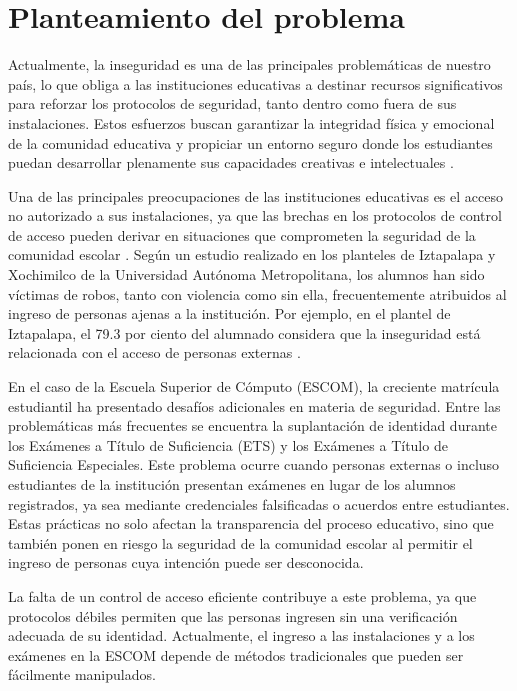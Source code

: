 

\section{Planteamiento del problema}

Actualmente, la inseguridad es una de las principales problemáticas de nuestro país, lo que obliga a las instituciones educativas a destinar recursos significativos para reforzar los protocolos de seguridad, tanto dentro como fuera de sus instalaciones. Estos esfuerzos buscan garantizar la integridad física y emocional de la comunidad educativa y propiciar un entorno seguro donde los estudiantes puedan desarrollar plenamente sus capacidades creativas e intelectuales \cite{L03}.

Una de las principales preocupaciones de las instituciones educativas es el acceso no autorizado a sus instalaciones, ya que las brechas en los protocolos de control de acceso pueden derivar en situaciones que comprometen la seguridad de la comunidad escolar \cite{L04}. Según un estudio realizado en los planteles de Iztapalapa y Xochimilco de la Universidad Autónoma Metropolitana, los alumnos han sido víctimas de robos, tanto con violencia como sin ella, frecuentemente atribuidos al ingreso de personas ajenas a la institución. Por ejemplo, en el plantel de Iztapalapa, el 79.3 por ciento del alumnado considera que la inseguridad está relacionada con el acceso de personas externas \cite{L05}.

En el caso de la Escuela Superior de Cómputo (ESCOM), la creciente matrícula estudiantil ha presentado desafíos adicionales en materia de seguridad. Entre las problemáticas más frecuentes se encuentra la suplantación de identidad durante los Exámenes a Título de Suficiencia (ETS) y los Exámenes a Título de Suficiencia Especiales. Este problema ocurre cuando personas externas o incluso estudiantes de la institución presentan exámenes en lugar de los alumnos registrados, ya sea mediante credenciales falsificadas o acuerdos entre estudiantes. Estas prácticas no solo afectan la transparencia del proceso educativo, sino que también ponen en riesgo la seguridad de la comunidad escolar al permitir el ingreso de personas cuya intención puede ser desconocida. 

La falta de un control de acceso eficiente contribuye a este problema, ya que protocolos débiles permiten que las personas ingresen sin una verificación adecuada de su identidad. Actualmente, el ingreso a las instalaciones y a los exámenes en la ESCOM depende de métodos tradicionales que pueden ser fácilmente manipulados. 